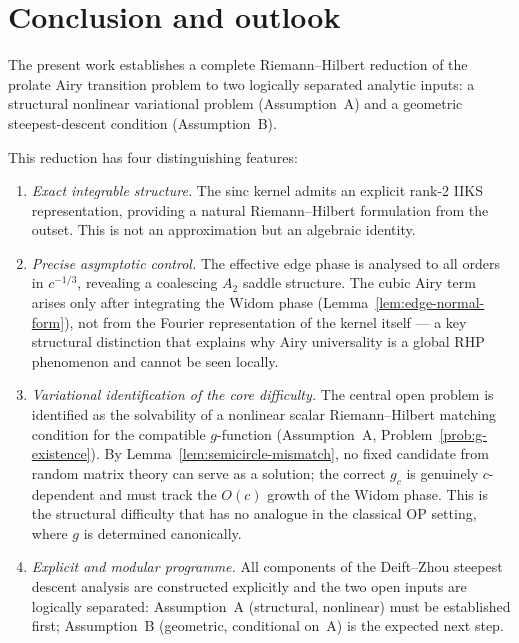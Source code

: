 \documentclass[12pt,a4paper]{amsart}
\theoremstyle{definition}
\theoremstyle{remark}
\begin{document}
\section{Conclusion and outlook}
\label{sec:conclusion}

The present work establishes a complete Riemann--Hilbert reduction
of the prolate Airy transition problem to two logically separated
analytic inputs: a structural nonlinear variational problem
(Assumption~A) and a geometric steepest-descent condition
(Assumption~B).

This reduction has four distinguishing features:
\begin{enumerate}[label=(\roman*)]
\item \emph{Exact integrable structure.}
The sinc kernel admits an explicit rank-2 IIKS representation,
providing a natural Riemann--Hilbert formulation from the outset.
This is not an approximation but an algebraic identity.

\item \emph{Precise asymptotic control.}
The effective edge phase is analysed to all orders in $c^{-1/3}$,
revealing a coalescing $A_2$ saddle structure.
The cubic Airy term arises only after integrating the Widom phase
(Lemma~\ref{lem:edge-normal-form}), not from the Fourier
representation of the kernel itself --- a key structural distinction
that explains why Airy universality is a global RHP phenomenon and
cannot be seen locally.

\item \emph{Variational identification of the core difficulty.}
The central open problem is identified as the solvability of a
nonlinear scalar Riemann--Hilbert matching condition for the
compatible $g$-function (Assumption~A,
Problem~\ref{prob:g-existence}).
By Lemma~\ref{lem:semicircle-mismatch}, no fixed candidate from
random matrix theory can serve as a solution; the correct $g_c$
is genuinely $c$-dependent and must track the $O(c)$ growth of
the Widom phase.
This is the structural difficulty that has no analogue in the
classical OP setting, where $g$ is determined canonically.

\item \emph{Explicit and modular programme.}
All components of the Deift--Zhou steepest descent analysis
are constructed explicitly and the two open inputs are
logically separated: Assumption~A (structural, nonlinear) must
be established first; Assumption~B (geometric, conditional on~A)
is the expected next step.
\end{enumerate}
\end{document}
